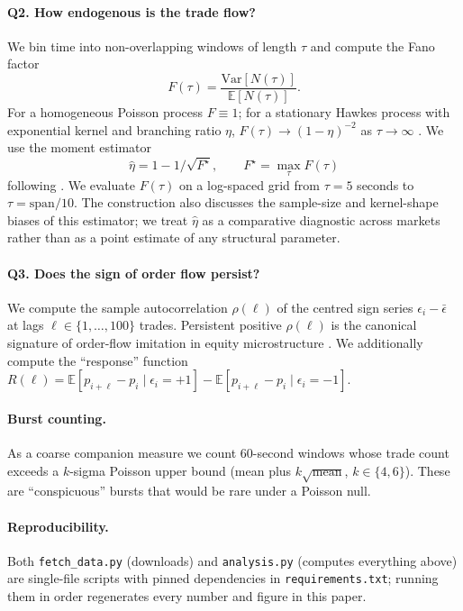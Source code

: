 \documentclass{article}
\begin{document}
\paragraph{Q2. How endogenous is the trade flow?} We bin time into
non-overlapping windows of length $\tau$ and compute the Fano factor
\begin{equation}
  F(\tau) = \frac{\mathrm{Var}[N(\tau)]}{\mathbb{E}[N(\tau)]}.
\end{equation}
For a homogeneous Poisson process $F\equiv 1$; for a stationary Hawkes
process with exponential kernel and branching ratio $\eta$, $F(\tau)\to
(1-\eta)^{-2}$ as $\tau\to\infty$ \citep{bacry2015hawkes}. We use the
moment estimator
\begin{equation}\label{eq:eta}
  \hat\eta = 1 - 1/\sqrt{F^\star}, \qquad
  F^\star = \max_\tau F(\tau)
\end{equation}
following \citet{hardiman2013critical}. We evaluate $F(\tau)$ on a
log-spaced grid from $\tau=5$ seconds to $\tau= \mathrm{span}/10$. The
\citet{hardiman2013critical} construction also discusses the
sample-size and kernel-shape biases of this estimator; we treat
$\hat\eta$ as a comparative diagnostic across markets rather than as a
point estimate of any structural parameter.

\paragraph{Q3. Does the sign of order flow persist?} We compute the
sample autocorrelation $\rho(\ell)$ of the centred sign series
$\epsilon_i - \bar\epsilon$ at lags $\ell\in\{1,\ldots,100\}$ trades.
Persistent positive $\rho(\ell)$ is the canonical signature of order-flow
imitation in equity microstructure
\citep{bouchaud2004fluctuations}. We additionally compute the
``response'' function $R(\ell) = \mathbb{E}[p_{i+\ell}-p_i \mid
\epsilon_i=+1] - \mathbb{E}[p_{i+\ell}-p_i \mid \epsilon_i=-1]$.

\paragraph{Burst counting.} As a coarse companion measure we count
60-second windows whose trade count exceeds a $k$-sigma Poisson upper
bound (mean plus $k\sqrt{\mathrm{mean}}$, $k\in\{4,6\}$). These are
``conspicuous'' bursts that would be rare under a Poisson null.

\paragraph{Reproducibility.} Both \texttt{fetch\_data.py} (downloads)
and \texttt{analysis.py} (computes everything above) are
single-file scripts with pinned dependencies in
\texttt{requirements.txt}; running them in order regenerates every
number and figure in this paper.
\end{document}
